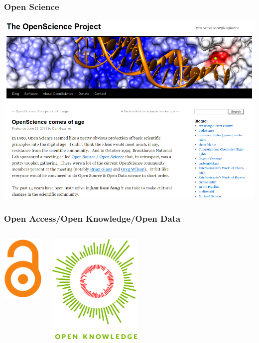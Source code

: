 \documentclass{beamer}
\begin{document}
\begin{frame}
   \frametitle{Open Science}
   \begin{center}
     \includegraphics[width=\textwidth]{images/openscience.png}
   \end{center}
\end{frame}

\begin{frame}
   \frametitle{Open Access/Open Knowledge/Open Data}
   \begin{columns}
     \column{4cm}
     \begin{center}
       \includegraphics[width=2cm]{images/openaccess.png}\\
	\end{center}
    \column{5cm}
    \begin{center}
	\includegraphics[width=4.5cm]{images/Open_Knowledge_logo.png}
     \end{center}
   \end{columns}
\end{frame}
\end{document}
